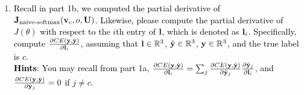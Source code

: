 \begin{parts}
\begin{enumerate}[label=\roman*.]

        \item \textcolor{black}{Recall in part 1b, we computed the partial derivative of $\mathbf{J}_{\text{naive-softmax}}(\mathbf{v}_c, o, \mathbf{U})$. Likewise, please compute the partial derivative of $J(\theta)$ with respect to the $i$th entry of $\mathbf{l}$, which is denoted as $\mathbf{l}_i$. Specifically, compute $\frac{\partial CE(\mathbf{y}, \hat{\mathbf{y}})}{\partial \mathbf{l}_i}$, assuming that $\mathbf{l} \in \mathbb{R}^3$, $\hat{\mathbf{y}} \in \mathbb{R}^3$, $\mathbf{y} \in \mathbb{R}^3$, and the true label is $c$. \\
        \textbf{Hints}: You may recall from part 1a, $\frac{\partial CE(\mathbf{y}, \hat{\mathbf{y}})}{\partial \mathbf{l}_i} = \sum_j \frac{\partial CE(\mathbf{y}, \hat{\mathbf{y}})}{\partial \hat{\mathbf{y}}_j}\frac{\partial \hat{\mathbf{y}}_j}{\partial \mathbf{l}_i}$, and $\frac{\partial CE(\mathbf{y}, \hat{\mathbf{y}})}{\partial \hat{\mathbf{y}}_j}=0$ if $j \neq c$. 
        }


\end{enumerate}
\end{parts}
